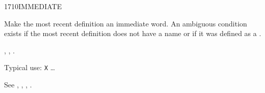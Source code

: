 \begin{worddef}{1710}{IMMEDIATE}
\item \stack{}{}

	Make the most recent definition an immediate word. An ambiguous
	condition exists if the most recent definition does not have a
	name or if it was defined as a .

\see {},
	,
	.

	\begin{rationale} %
		Typical use:
			\word{:} \texttt{X}
			{\ldots} \word{;} 
	\end{rationale}

	\begin{testing} %
		See ,
			,
			,
			.
	\end{testing}
\end{worddef}


